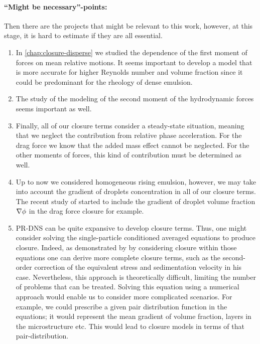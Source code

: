 \paragraph*{``Might be necessary''-points: }
Then there are the projects that might be relevant to this work, 
however, at this stage, it is hard to estimate if they are all essential.
\begin{enumerate}
    \item In \ref{chap:closure-disperse} we studied the dependence of the first moment of forces on mean relative motions.
    It seems important to develop a model that is more accurate for higher Reynolds number and volume fraction since it could be predominant for the rheology of dense emulsion. 
    \item The study of the modeling of the second moment of the hydrodynamic forces seems important as well. 
    \item Finally, all of our closure terms consider a steady-state situation, meaning that we neglect the contribution from relative phase acceleration. 
    For the drag force we know that the added mass effect cannot be neglected. 
    For the other moments of forces, this kind of contribution must be determined as well. 
    \item Up to now we considered homogeneous rising emulsion, however, we may take into account the gradient of droplets concentration in all of our closure terms. 
    The recent study of \citet{wang2024effect} started to include the gradient of droplet volume fraction $\mathbf{\nabla}\phi$ in the drag force closure for example.  
    \item PR-DNS can be quite expansive to develop closure terms. 
    Thus, one might consider solving the single-particle conditioned averaged equations to produce closure.  
    Indeed, as demonstrated by \citet{hinch1977averaged} by considering closure within those equations one can derive more complete closure terms, such as the second-order correction of the equivalent stress and sedimentation velocity in his case. 
    Nevertheless, this approach is theoretically difficult, limiting the number of problems that can be treated. 
    Solving this equation using a numerical approach would enable us to consider more complicated scenarios. 
    For example, we could prescribe a given pair distribution function in the equations; it would represent the mean gradient of volume fraction, layers in the microstructure etc. 
    This would lead to closure models in terms of that pair-distribution. 
\end{enumerate}


    